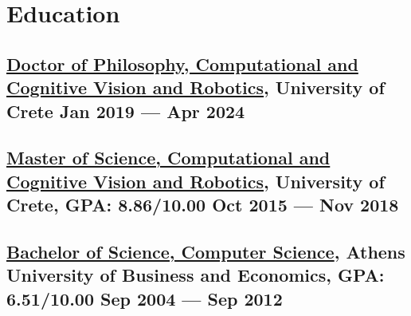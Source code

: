 \documentclass[a4,8pt]{article}
\begin{document}
\section{Education }
\linespread{0.6} 
\subsection*{ \href{https://www.didaktorika.gr/eadd/handle/10442/56972}{Doctor of Philosophy, Computational and Cognitive Vision and Robotics}, {\normalsize \normalfont University of Crete } \hfill Jan 2019 --- Apr 2024} 
\vspace{0.1cm}
\subsection*{ \href{http://ammar.gr/msc.pdf}{Master of Science, Computational and Cognitive Vision and Robotics}, {\normalsize \normalfont University of Crete, GPA: 8.86/10.00} \hfill Oct 2015 --- Nov 2018} 
\vspace{0.1cm}
\subsection*{\href{https://github.com/AmmarkoV/RoboVision/raw/master/Documentation/GuarDDoG_RoboVision.pdf}{Bachelor of Science, Computer Science}, {\normalsize \normalfont Athens University of Business and Economics, GPA: 6.51/10.00} \hfill Sep 2004 --- Sep 2012} 
\vspace{0.2cm}

\linespread{0.82} 
\end{document}
